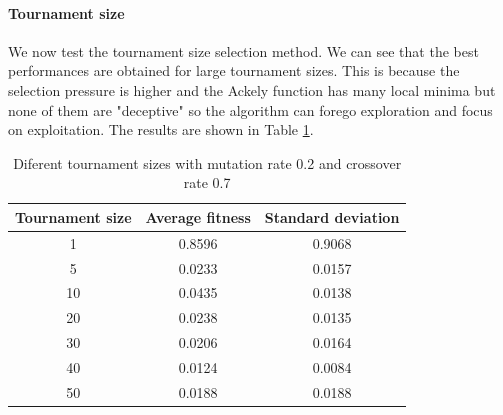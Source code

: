 \paragraph*{Tournament size}
We now test the tournament size selection method. We can see that the best performances are obtained for large tournament sizes. This is because the selection pressure is higher and the Ackely function has many local minima but none of them are "deceptive" so the algorithm can forego exploration and focus on exploitation. The results are shown in Table \ref{tab:tournament_size}.
\begin{table}[H]
    \centering
    \begin{tabular}{|c|c|c|}
        Tournament size & Average fitness & Standard deviation \\ \hline
        1               & 0.8596          & 0.9068             \\
        5               & 0.0233          & 0.0157             \\
        10              & 0.0435          & 0.0138             \\
        20              & 0.0238          & 0.0135             \\
        30              & 0.0206          & 0.0164             \\
        40              & 0.0124          & 0.0084             \\
        50              & 0.0188          & 0.0188             \\
    \end{tabular}
    \caption{Diferent tournament sizes with mutation rate 0.2 and crossover rate 0.7}
    \label{tab:tournament_size}
\end{table}

